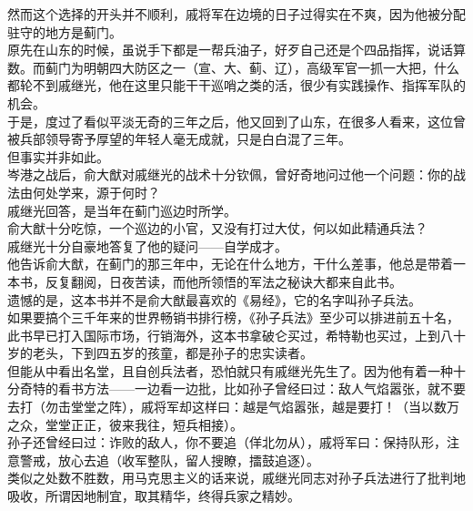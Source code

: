 \begin{multicols}{\theparacolNo}
然而这个选择的开头并不顺利，戚将军在边境的日子过得实在不爽，因为他被分配驻守的地方是蓟门。\\

原先在山东的时候，虽说手下都是一帮兵油子，好歹自己还是个四品指挥，说话算数。而蓟门为明朝四大防区之一（宣、大、蓟、辽），高级军官一抓一大把，什么都轮不到戚继光，他在这里只能干干巡哨之类的活，很少有实践操作、指挥军队的机会。\\

于是，度过了看似平淡无奇的三年之后，他又回到了山东，在很多人看来，这位曾被兵部领导寄予厚望的年轻人毫无成就，只是白白混了三年。\\

但事实并非如此。\\

岑港之战后，俞大猷对戚继光的战术十分钦佩，曾好奇地问过他一个问题：你的战法由何处学来，源于何时？\\

戚继光回答，是当年在蓟门巡边时所学。\\

俞大猷十分吃惊，一个巡边的小官，又没有打过大仗，何以如此精通兵法？\\

戚继光十分自豪地答复了他的疑问——自学成才。\\

他告诉俞大猷，在蓟门的那三年中，无论在什么地方，干什么差事，他总是带着一本书，反复翻阅，日夜苦读，而他所领悟的军法之秘诀大都来自此书。\\

遗憾的是，这本书并不是俞大猷最喜欢的《易经》，它的名字叫孙子兵法。\\

如果要搞个三千年来的世界畅销书排行榜，《孙子兵法》至少可以排进前五十名，此书早已打入国际市场，行销海外，这本书拿破仑买过，希特勒也买过，上到八十岁的老头，下到四五岁的孩童，都是孙子的忠实读者。\\

但能从中看出名堂，且自创兵法者，恐怕就只有戚继光先生了。因为他有着一种十分奇特的看书方法——一边看一边批，比如孙子曾经曰过：敌人气焰嚣张，就不要去打（勿击堂堂之阵），戚将军却这样曰：越是气焰嚣张，越是要打！（当以数万之众，堂堂正正，彼来我往，短兵相接）。\\

孙子还曾经曰过：诈败的敌人，你不要追（佯北勿从），戚将军曰：保持队形，注意警戒，放心去追（收军整队，留人搜瞭，擂鼓追逐）。\\

类似之处数不胜数，用马克思主义的话来说，戚继光同志对孙子兵法进行了批判地吸收，所谓因地制宜，取其精华，终得兵家之精妙。\\


\end{multicols}
